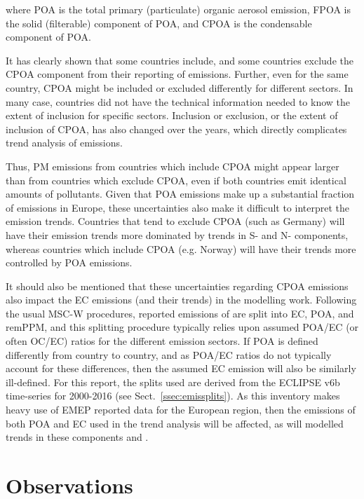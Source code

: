 where POA is the total primary (particulate) organic aerosol emission, FPOA
is the solid (filterable)  component of POA, and CPOA is the condensable
component of POA.

It has clearly shown that some countries include, and some countries
exclude the CPOA component from their reporting of \pmfine emissions. Further, even
for the same country, CPOA might be included or excluded differently for
different sectors. In many case, countries did not have the technical
information needed to know the extent of inclusion for specific
sectors. Inclusion or exclusion, or the extent of inclusion of CPOA, has
also changed over the years, which directly complicates trend analysis
of emissions.

Thus, PM emissions from countries which include CPOA might appear
larger than from countries which exclude CPOA, even if both countries
emit identical amounts of pollutants. Given that POA emissions make up a
substantial fraction of \pmfine emissions in Europe, these uncertainties
also make it difficult to interpret the emission trends. Countries that
tend to exclude CPOA (such as Germany) will have their \pmfine emission
trends more dominated by trends in S- and N- components, whereas countries
which include CPOA (e.g. Norway) will have their trends more controlled
by POA emissions.


It should also be mentioned that these uncertainties regarding CPOA
emissions also impact the EC emissions (and their trends) in the
modelling work. Following the usual MSC-W procedures, reported emissions
of \pmfine are split into EC, POA, and remPPM, and this splitting
procedure typically relies upon assumed POA/EC (or often OC/EC) ratios for the different
emission sectors. If POA is defined differently from country to country,
and as POA/EC ratios do not typically account for these differences,
then the assumed EC emission will also be similarly ill-defined. For this report, the
splits used are derived from the ECLIPSE v6b time-series for 2000-2016
(see Sect.~\ref{ssec:emissplits}). As this inventory makes heavy use of
EMEP reported data for the European region, then the emissions of both POA and EC used in the trend analysis will be affected, as will modelled trends in these components and \pmfine.


\section{\label{OBSTrends}{Observations}}

